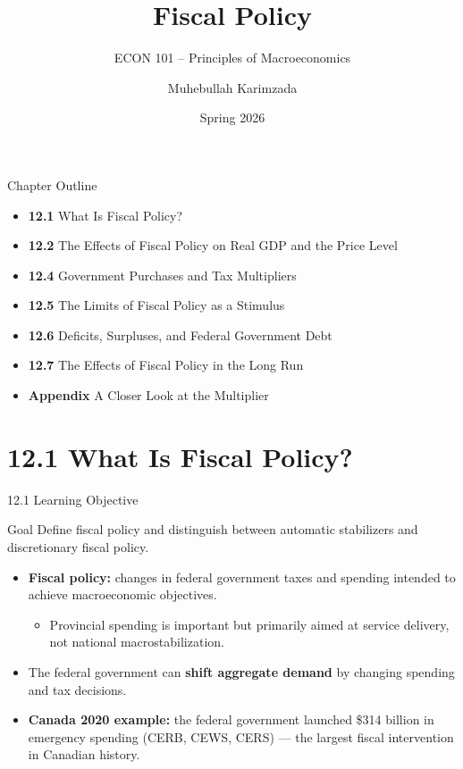 \documentclass[aspectratio=169]{beamer}
\title{\textbf{Fiscal Policy}}
\subtitle{{\large ECON 101 -- Principles of Macroeconomics}}
\author{Muhebullah Karimzada}
\date{Spring 2026}
\begin{document}

\begin{frame}[plain]
  \titlepage
\end{frame}

\begin{frame}{Chapter Outline}
\transfade
\begin{itemize}
  \item \textbf{12.1} What Is Fiscal Policy?
  \item \textbf{12.2} The Effects of Fiscal Policy on Real GDP and the Price Level
  \item \textbf{12.4} Government Purchases and Tax Multipliers
  \item \textbf{12.5} The Limits of Fiscal Policy as a Stimulus
  \item \textbf{12.6} Deficits, Surpluses, and Federal Government Debt
  \item \textbf{12.7} The Effects of Fiscal Policy in the Long Run
  \item \textbf{Appendix} A Closer Look at the Multiplier
\end{itemize}
\end{frame}

\section{12.1 What Is Fiscal Policy?}

\begin{frame}{12.1 Learning Objective}
\transfade
\begin{block}{Goal}
Define fiscal policy and distinguish between automatic stabilizers and discretionary fiscal policy.
\end{block}
\begin{itemize}
  \item \textbf{Fiscal policy:} changes in \alert{federal government taxes and spending} intended to achieve macroeconomic objectives.
  \begin{itemize}
    \item Provincial spending is important but primarily aimed at service delivery, not national macrostabilization.
  \end{itemize}
  \item The federal government can \textbf{shift aggregate demand} by changing spending and tax decisions.
  \item \textbf{Canada 2020 example:} the federal government launched \$314 billion in emergency spending (CERB, CEWS, CERS) --- the largest fiscal intervention in Canadian history.
\end{itemize}
\end{frame}
\end{document}
